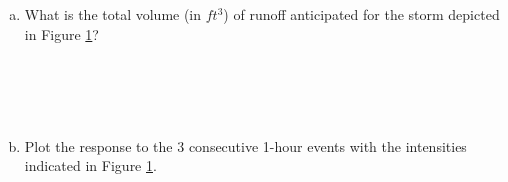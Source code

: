 \documentclass[12pt]{article}
\begin{document}
\begin{enumerate}
\begin{enumerate}[a)]
\begin{figure}[htbp]
   \caption{3-hour event comprised of 3 consecutive 1-hour events.}
   \label{fig:UnitHydrographOutput}
\end{figure}
\item What is the total volume (in $ft^3$) of runoff anticipated for the storm depicted in Figure \ref{fig:UnitHydrographOutput}?  \\
~\\
~\\
~\\
~\\
\item Plot the response to the 3 consecutive 1-hour events with the intensities indicated in Figure \ref{fig:UnitHydrographOutput}.
\end{enumerate}



\clearpage

\end{enumerate}
\end{document}

